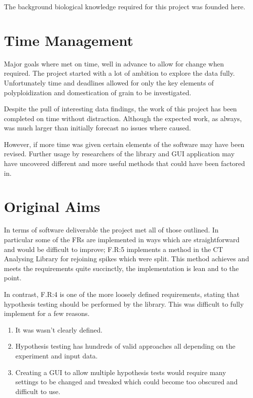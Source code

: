 \documentclass[11pt]{report}
\begin{document}
The background biological knowledge required for this project was founded here.

\section{Time Management}
\label{sec:org8869d08}
Major goals where met on time, well in advance to allow for change when required. The project started with a lot of ambition to explore the data fully. Unfortunately time and deadlines allowed for only the key elements of polyploidization and domestication of grain to be investigated.

Despite the pull of interesting data findings, the work of this project has been completed on time without distraction. Although the expected work, as always, was much larger than initially forecast no issues where caused.

However, if more time was given certain elements of the software may have been revised. Further usage by researchers of the library and GUI application may have uncovered  different and more useful methods that could have been factored in.

\section{Original Aims}
\label{sec:org4ece4ad}
In terms of software deliverable the project met all of those outlined. In particular some of the FRs are implemented in ways which are straightforward and would be difficult to improve; F.R:5 implements a method in the CT Analysing Library for rejoining spikes which were split. This method achieves and meets the requirements quite succinctly, the implementation is lean and to the point.

In contrast, F.R:4 is one of the more loosely defined requirements, stating that hypothesis testing should be performed by the library. This was difficult to fully implement for a few reasons.

\begin{enumerate}
\item It was wasn't clearly defined.
\item Hypothesis testing has hundreds of valid approaches all depending on the experiment and input data.
\item Creating a GUI to allow multiple hypothesis tests would require many settings to be changed and tweaked which could become too obscured and difficult to use.
\end{enumerate}
\end{document}
